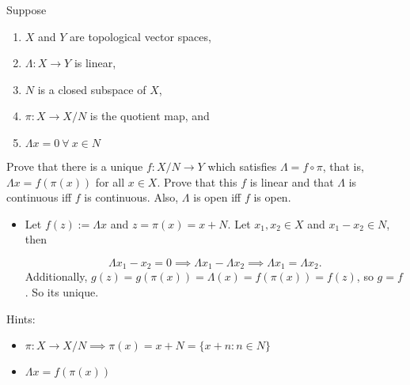 Suppose
\begin{enumerate}
    \item $X$ and $Y$ are topological vector spaces,
    \item $\Lambda: X \to Y$ is linear,
    \item $N$ is a closed subspace of $X$,
    \item $\pi: X \to X/N$ is the quotient map, and
    \item $\Lambda x=0 \ \forall \ x \in N$
\end{enumerate}
Prove that there is a unique $f: X/N\to Y$ which satisfies $\Lambda=f\circ \pi$, that is, $\Lambda x=f(\pi(x))$ for all $x\in X$. Prove that this $f$ is linear and that $\Lambda$ is continuous iff $f$ is continuous. Also, $\Lambda$ is open iff $f$ is open.

\begin{itemize}
    \item Let $f(z) := \Lambda x$ and $z=\pi(x)=x+N$. Let $x_1,x_2\in X$ and $x_1-x_2\in N$, then
    
    $$\Lambda x_1-x_2=0\implies \Lambda x_1-\Lambda x_2\implies \Lambda x_1=\Lambda x_2.$$
    Additionally, $g(z) = g(\pi(x)) = \Lambda(x) = f(\pi(x)) = f(z)$, so $g=f$. So its unique.

    

\end{itemize}

Hints:
\begin{itemize}
    \item $\pi: X \to X/N \implies \pi(x)=x+N=\{x+n: n\in N\}$
    \item $\Lambda x=f(\pi(x))$
\end{itemize}